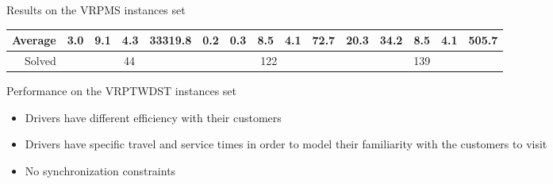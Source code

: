 \documentclass[9pt,xcolor={dvipsnames}]{beamer}
\begin{document}
\begin{frame}{Results on the VRPMS instances set}
{\begin{table}[H]
{\begin{tabular}{m{0.4cm}|cccccccccccccc}
\\[-0.8em]            
\multicolumn{1}{r}{Average}  & 3.0  & 9.1  & 4.3   & 33319.8  & 0.2    & 0.3  & 8.5 & 4.1 & 72.7 & 20.3 & 34.2  & 8.5   & 4.1   & 505.7   \\ \hline         
\multicolumn{1}{r|}{Solved}  &\multicolumn{4}{c}{44} &\multicolumn{5}{c}{122}  & \multicolumn{5}{c}{139}  \\ \hline         
\end{tabular}}
\end{table}
}
\end{frame}

\begin{frame}[allowframebreaks]{Performance on the VRPTWDST instances set}
\vspace*{10mm}
	\begin{block}{ \cite{schneider2016vehicle} }
		\begin{itemize}
			\item Drivers have different efficiency with their customers
			\item Drivers have specific travel and service times in order to model their familiarity with the customers to visit
			\item No synchronization constraints
		\end{itemize}
	\end{block}

\newpage
\vspace*{-5mm}
\selectfont{

\vspace*{-5mm}


}
\end{frame}
\end{document}
